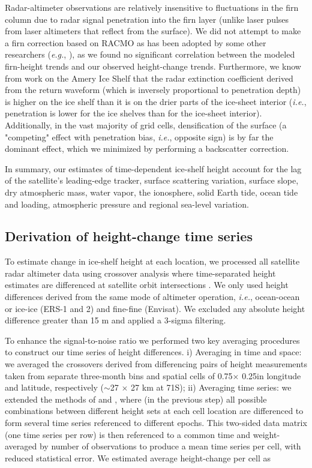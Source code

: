 Radar-altimeter observations are relatively insensitive to fluctuations in the
firn column due to radar signal penetration into the firn layer (unlike laser
pulses from laser altimeters that reflect from the surface). We did not 
attempt to make a firn correction based on RACMO \parencite{vanMeijgaard2008}
as has been adopted by some other researchers ({\it e.g.}, \textcite{Pritchard2012}),
as we found no significant correlation between the modeled firn-height trends
and our observed height-change trends. Furthermore, we know from work on the
Amery Ice Shelf \parencite{Phillips1999} that the radar extinction coefficient
derived from the return waveform (which is inversely proportional to
penetration depth) is higher on the ice shelf than it is on the drier parts of
the ice-sheet interior ({\it i.e.}, penetration is lower for the ice shelves than
for the ice-sheet interior). Additionally, in the vast majority of grid cells,
densification of the surface (a "competing" effect with penetration bias, {\it i.e.},
opposite sign) is by far the dominant effect, which we minimized by performing
a backscatter correction.

In summary, our estimates of time-dependent ice-shelf height account for the
lag of the satellite's leading-edge tracker, surface scattering variation,
surface slope, dry atmospheric mass, water vapor, the ionosphere, solid Earth
tide, ocean tide and loading, atmospheric pressure and regional sea-level
variation.

\subsection*{Derivation of height-change time series}

To estimate change in ice-shelf height at each location, we processed all
satellite radar altimeter data using crossover analysis where time-separated
height estimates are differenced at satellite orbit intersections 
\parencite{Zwally2005, Davis2004, Wingham2009}. We only used height differences
derived from the same mode of altimeter operation, {\it i.e.}, ocean-ocean or ice-ice
(ERS-1 and 2) and fine-fine (Envisat). We excluded any absolute height
difference greater than 15 m and applied a 3-sigma filtering.

To enhance the signal-to-noise ratio we performed two key averaging procedures
to construct our time series of height differences. i) Averaging in time and
space: we averaged the crossovers derived from differencing pairs of height
measurements taken from separate three-month bins and spatial cells of
0.75\degree $\times$ 0.25\degree in longitude and latitude, respectively 
($\sim$27 $\times$ 27 km at 71\degree S); ii) Averaging time series: we
extended the methods of \textcite{Li2006} and \textcite{Khvorostovsky2012},
where (in the previous step) all possible combinations between different
height sets at each cell location are differenced to form several time series
referenced to different epochs. This two-sided data matrix (one time series
per row) is then referenced to a common time and weight-averaged by number of
observations to produce a mean time series per cell, with reduced statistical
error. We estimated average height-change per cell as

